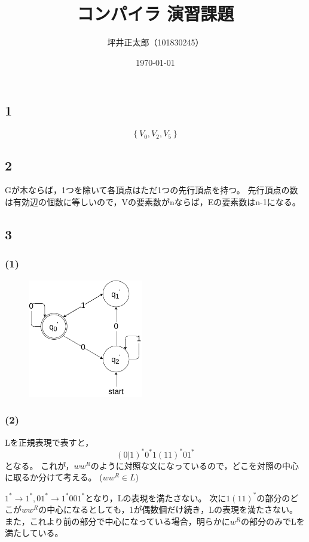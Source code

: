 \documentclass[a4paper,12pt]{jsarticle}
\begin{document}
\title{コンパイラ 演習課題}
\author{坪井正太郎（101830245）}
\date{\today}
\maketitle
\subsection*{1}
\[\left\{V_0, V_2, V_5\right\}\]

\subsection*{2}
Gが木ならば，1つを除いて各頂点はただ1つの先行頂点を持つ。
先行頂点の数は有効辺の個数に等しいので，Vの要素数がnならば，Eの要素数はn-1になる。

\subsection*{3}
\subsubsection*{(1)}
\begin{figure}[htb]
  \begin{center}
  \includegraphics[width=5cm]{1.png}
  \end{center}
\end{figure}

\subsubsection*{(2)}
Lを正規表現で表すと，\[(0|1)^* 0^* 1 (11)^* 0 1^*\]となる。
これが，$ww^R$のように対照な文になっているので，どこを対照の中心に取るか分けて考える。
($ww^R\in L$)

$1^*→1^*,01^*→1^*001^*$となり，Lの表現を満たさない。
次に$1 (11)^*$の部分のどこが$ww^R$の中心になるとしても，1が偶数個だけ続き，Lの表現を満たさない。
また，これより前の部分で中心になっている場合，明らかに$w^R$の部分のみでLを満たしている。
\end{document}
